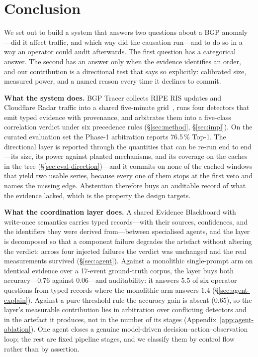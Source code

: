 \section{Conclusion}
\label{sec:conclusion}

We set out to build a system that answers two questions about a BGP
anomaly---did it affect traffic, and which way did the causation
run---and to do so in a way an operator could audit afterwards. The first
question has a categorical answer. The second has an answer only when the
evidence identifies an order, and our contribution is a directional test
that says so explicitly: calibrated size, measured power, and a named
reason every time it declines to commit.

\textbf{What the system does.} BGP Tracer collects RIPE RIS updates and
Cloudflare Radar traffic into a shared five-minute
grid~\cite{ripe-ris,cloudflare-radar}, runs four detectors that emit
typed evidence with provenance, and arbitrates them into a five-class
correlation verdict under six precedence rules (\S\ref{sec:method},
\S\ref{sec:impl}). On the curated evaluation set the Phase-1
arbitration reports 76.5\,\% Top-1. The directional layer is reported
through the quantities that can be re-run end to end---its size, its power
against planted mechanisms, and its coverage on the caches in the tree
(\S\ref{sec:eval-direction})---and it commits on none of the cached
windows that yield two usable series, because every one of them stops at
the first veto and names the missing edge. Abstention therefore buys an
auditable record of what the evidence lacked, which is the property the
design targets.

\textbf{What the coordination layer does.} A shared Evidence Blackboard
with write-once semantics carries typed records---with their sources,
confidences, and the identifiers they were derived from---between
specialised agents, and the layer is decomposed so that a component
failure degrades the artefact without altering the verdict: across four
injected failures the verdict was unchanged and the real measurements
survived (\S\ref{sec:agent}). Against a monolithic single-prompt arm on
identical evidence over a 17-event ground-truth corpus, the layer buys
both accuracy---$0.76$ against $0.06$---and auditability: it answers
$5.5$ of six operator questions from typed records where the monolithic arm
answers $1.4$ (\S\ref{sec:agent-explain}). Against a pure threshold rule
the accuracy gain is absent ($0.65$), so the layer's measurable
contribution lies in arbitration over conflicting detectors and in the
artefact it produces, not in the number of its stages
(Appendix~\ref{app:agent-ablation}). One agent closes a genuine
model-driven decision--action--observation loop; the rest are fixed
pipeline stages, and we classify them by control flow rather than by
assertion.

